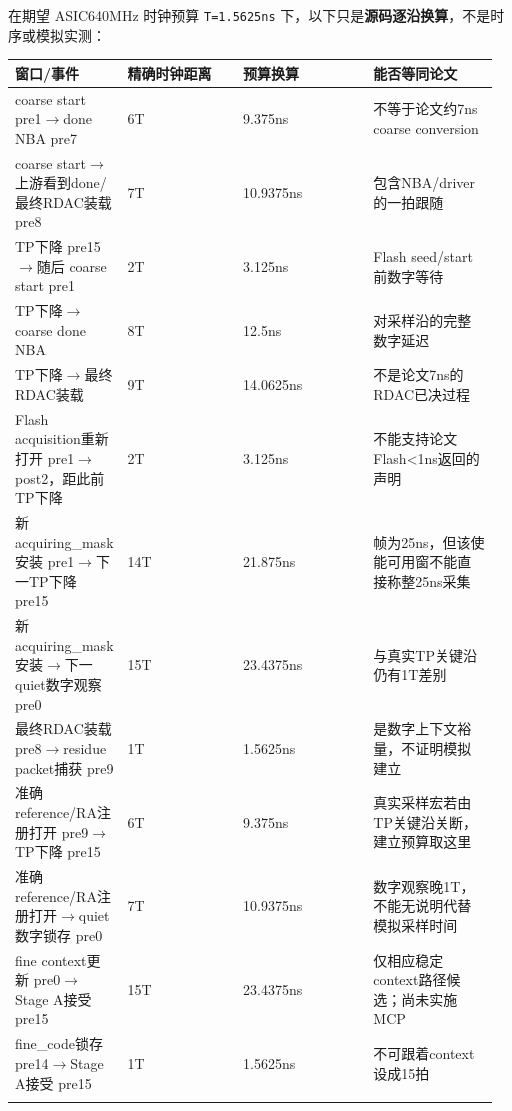 \documentclass[UTF8,fontset=fandol,10pt,a4paper,openany]{ctexrep}
\newcommand{\code}[1]{\nolinkurl{#1}}
\begin{document}
在期望 ASIC640MHz 时钟预算 \code{T=1.5625ns} 下，以下只是\textbf{源码逐沿换算}，不是时序或模拟实测：


\begingroup\small\setlength{\tabcolsep}{2pt}\renewcommand{\arraystretch}{1.25}\begin{longtable}{@{}>{\raggedright\arraybackslash}p{0.19\linewidth}>{\raggedright\arraybackslash}p{0.24\linewidth}>{\raggedright\arraybackslash}p{0.27\linewidth}>{\raggedright\arraybackslash}p{0.26\linewidth}@{}}
\toprule
\textbf{窗口/事件} & \textbf{精确时钟距离} & \textbf{预算换算} & \textbf{能否等同论文}\\\midrule\endhead
coarse start pre1\ensuremath{\rightarrow}done NBA pre7 & 6T & 9.375ns & 不等于论文约7ns coarse conversion\\\addlinespace[2pt]
coarse start\ensuremath{\rightarrow}上游看到done/最终RDAC装载 pre8 & 7T & 10.9375ns & 包含NBA/driver的一拍跟随\\\addlinespace[2pt]
TP下降 pre15\ensuremath{\rightarrow}随后 coarse start pre1 & 2T & 3.125ns & Flash seed/start前数字等待\\\addlinespace[2pt]
TP下降\ensuremath{\rightarrow}coarse done NBA & 8T & 12.5ns & 对采样沿的完整数字延迟\\\addlinespace[2pt]
TP下降\ensuremath{\rightarrow}最终RDAC装载 & 9T & 14.0625ns & 不是论文7ns的RDAC已决过程\\\addlinespace[2pt]
Flash acquisition重新打开 pre1\ensuremath{\rightarrow}post2，距此前TP下降 & 2T & 3.125ns & 不能支持论文Flash<1ns返回的声明\\\addlinespace[2pt]
新acquiring\_mask安装 pre1\ensuremath{\rightarrow}下一TP下降 pre15 & 14T & 21.875ns & 帧为25ns，但该使能可用窗不能直接称整25ns采集\\\addlinespace[2pt]
新acquiring\_mask安装\ensuremath{\rightarrow}下一quiet数字观察 pre0 & 15T & 23.4375ns & 与真实TP关键沿仍有1T差别\\\addlinespace[2pt]
最终RDAC装载 pre8\ensuremath{\rightarrow}residue packet捕获 pre9 & 1T & 1.5625ns & 是数字上下文裕量，不证明模拟建立\\\addlinespace[2pt]
准确reference/RA注册打开 pre9\ensuremath{\rightarrow}TP下降 pre15 & 6T & 9.375ns & 真实采样宏若由TP关键沿关断，建立预算取这里\\\addlinespace[2pt]
准确reference/RA注册打开\ensuremath{\rightarrow}quiet数字锁存 pre0 & 7T & 10.9375ns & 数字观察晚1T，不能无说明代替模拟采样时间\\\addlinespace[2pt]
fine context更新 pre0\ensuremath{\rightarrow}Stage A接受 pre15 & 15T & 23.4375ns & 仅相应稳定context路径候选；尚未实施MCP\\\addlinespace[2pt]
fine\_code锁存 pre14\ensuremath{\rightarrow}Stage A接受 pre15 & 1T & 1.5625ns & 不可跟着context设成15拍\\\addlinespace[2pt]
\bottomrule\end{longtable}\endgroup
\end{document}
